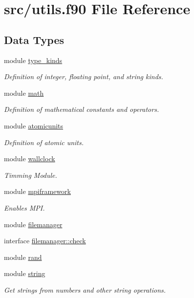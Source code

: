 \hypertarget{utils_8f90}{\section{src/utils.f90 File Reference}
\label{utils_8f90}
}
\subsection*{Data Types}
\begin{DoxyCompactItemize}
\item 
module \hyperlink{classtype__kinds}{type\+\_\+kinds}
\begin{DoxyCompactList}\small\item\em Definition of integer, floating point, and string kinds. \end{DoxyCompactList}\item 
module \hyperlink{classmath}{math}
\begin{DoxyCompactList}\small\item\em Definition of mathematical constants and operators. \end{DoxyCompactList}\item 
module \hyperlink{classatomicunits}{atomicunits}
\begin{DoxyCompactList}\small\item\em Definition of atomic units. \end{DoxyCompactList}\item 
module \hyperlink{classwallclock}{wallclock}
\begin{DoxyCompactList}\small\item\em Timming Module. \end{DoxyCompactList}\item 
module \hyperlink{classmpiframework}{mpiframework}
\begin{DoxyCompactList}\small\item\em Enables M\+P\+I. \end{DoxyCompactList}\item 
module \hyperlink{classfilemanager}{filemanager}
\item 
interface \hyperlink{interfacefilemanager_1_1check}{filemanager\+::check}
\item 
module \hyperlink{classrand}{rand}
\item 
module \hyperlink{classstring}{string}
\begin{DoxyCompactList}\small\item\em Get strings from numbers and other string operations. \end{DoxyCompactList}\item 

\end{DoxyCompactItemize}
